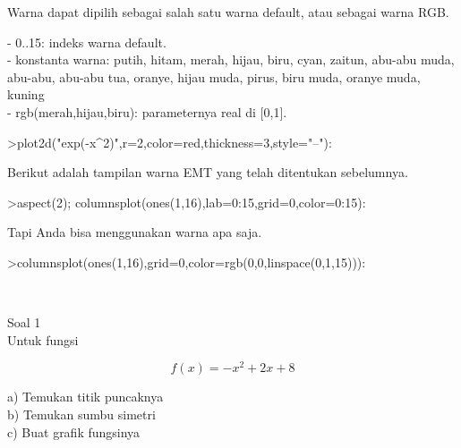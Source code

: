 \begin{eulernotebook}
\begin{eulercomment}
Warna dapat dipilih sebagai salah satu warna default, atau sebagai
warna RGB.

- 0..15: indeks warna default.\\
- konstanta warna: putih, hitam, merah, hijau, biru, cyan, zaitun,
abu-abu muda, abu-abu, abu-abu tua, oranye, hijau muda, pirus, biru
muda, oranye muda, kuning\\
- rgb(merah,hijau,biru): parameternya real di [0,1].
\end{eulercomment}
\begin{eulerprompt}
>plot2d("exp(-x^2)",r=2,color=red,thickness=3,style="--"):
\end{eulerprompt}
\begin{eulercomment}
Berikut adalah tampilan warna EMT yang telah ditentukan sebelumnya.
\end{eulercomment}
\begin{eulerprompt}
>aspect(2); columnsplot(ones(1,16),lab=0:15,grid=0,color=0:15):
\end{eulerprompt}
\begin{eulercomment}
Tapi Anda bisa menggunakan warna apa saja.
\end{eulercomment}
\begin{eulerprompt}
>columnsplot(ones(1,16),grid=0,color=rgb(0,0,linspace(0,1,15))):
\end{eulerprompt}
\\

\begin{eulercomment}
Soal 1\\
Untuk fungsi 

\end{eulercomment}
\begin{eulerformula}
\[
f(x) = -x^2+2x+8
\]
\end{eulerformula}
\begin{eulercomment}
a) Temukan titik puncaknya\\
b) Temukan sumbu simetri\\
c) Buat grafik fungsinya


\end{eulercomment}
\end{eulernotebook}

